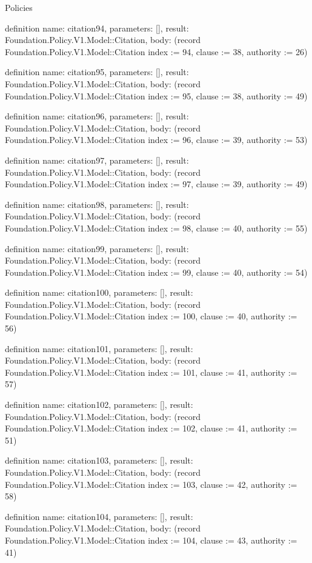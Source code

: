 \begin{lexlean}{Policies}
\begin{semanticmodule}
definition{
  name: citation94,
  parameters: [],
  result: Foundation.Policy.V1.Model::Citation,
  body: (record Foundation.Policy.V1.Model::Citation {index := 94, clause := 38, authority := 26})
}

definition{
  name: citation95,
  parameters: [],
  result: Foundation.Policy.V1.Model::Citation,
  body: (record Foundation.Policy.V1.Model::Citation {index := 95, clause := 38, authority := 49})
}

definition{
  name: citation96,
  parameters: [],
  result: Foundation.Policy.V1.Model::Citation,
  body: (record Foundation.Policy.V1.Model::Citation {index := 96, clause := 39, authority := 53})
}

definition{
  name: citation97,
  parameters: [],
  result: Foundation.Policy.V1.Model::Citation,
  body: (record Foundation.Policy.V1.Model::Citation {index := 97, clause := 39, authority := 49})
}

definition{
  name: citation98,
  parameters: [],
  result: Foundation.Policy.V1.Model::Citation,
  body: (record Foundation.Policy.V1.Model::Citation {index := 98, clause := 40, authority := 55})
}

definition{
  name: citation99,
  parameters: [],
  result: Foundation.Policy.V1.Model::Citation,
  body: (record Foundation.Policy.V1.Model::Citation {index := 99, clause := 40, authority := 54})
}

definition{
  name: citation100,
  parameters: [],
  result: Foundation.Policy.V1.Model::Citation,
  body: (record Foundation.Policy.V1.Model::Citation {index := 100, clause := 40, authority := 56})
}

definition{
  name: citation101,
  parameters: [],
  result: Foundation.Policy.V1.Model::Citation,
  body: (record Foundation.Policy.V1.Model::Citation {index := 101, clause := 41, authority := 57})
}

definition{
  name: citation102,
  parameters: [],
  result: Foundation.Policy.V1.Model::Citation,
  body: (record Foundation.Policy.V1.Model::Citation {index := 102, clause := 41, authority := 51})
}

definition{
  name: citation103,
  parameters: [],
  result: Foundation.Policy.V1.Model::Citation,
  body: (record Foundation.Policy.V1.Model::Citation {index := 103, clause := 42, authority := 58})
}

definition{
  name: citation104,
  parameters: [],
  result: Foundation.Policy.V1.Model::Citation,
  body: (record Foundation.Policy.V1.Model::Citation {index := 104, clause := 43, authority := 41})
}


\end{semanticmodule}
\end{lexlean}
